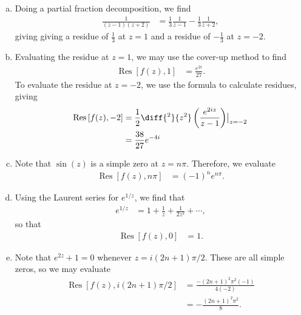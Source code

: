\documentclass[10pt]{mypackage}
\DeclareMathOperator{\res}{Res}
\begin{document}
\RaggedRight
\begin{solution}[21.1]\hfill
  \begin{enumerate}[(a)]
    \item Doing a partial fraction decomposition, we find
      \begin{align*}
        \frac{1}{\left( z-1 \right)\left( z+2 \right)} &= \frac{1}{3}\frac{1}{z-1} - \frac{1}{3}\frac{1}{z+2},
      \end{align*}
      giving giving a residue of $\frac{1}{3}$ at $z = 1$ and a residue of $-\frac{1}{3}$ at $z = -2$.
    \item Evaluating the residue at $z = 1$, we may use the cover-up method to find
      \begin{align*}
        \res\left[ f(z),1 \right] &= \frac{e^{2i}}{27}.
      \end{align*}
      To evaluate the residue at $z = -2$, we use the formula to calculate residues, giving
      \begin{align*}
        \res\left[ f(z),-2 \right] &= \frac{1}{2}\diff{^2}{z^2}\left( \frac{e^{2iz}}{z-1} \right)\bigr\vert_{z = -2}\\
                                   &= \frac{38}{27}e^{-4i}
      \end{align*}
    \item Note that $\sin(z)$ is a simple zero at $z = n\pi$. Therefore, we evaluate
      \begin{align*}
        \res\left[ f(z),n\pi \right] &= \left( -1 \right)^n e^{n\pi}.
      \end{align*}
    \item Using the Laurent series for $e^{1/z}$, we find that
      \begin{align*}
        e^{1/z} &= 1 + \frac{1}{z} + \frac{1}{2z^2} + \cdots,
      \end{align*}
      so that
      \begin{align*}
        \res\left[ f(z),0 \right] &= 1.
      \end{align*}
    \item Note that $e^{2z} + 1 = 0$ whenever $z = i(2n + 1)\pi/2$. These are all simple zeros, so we may evaluate
      \begin{align*}
        \res\left[ f(z),i\left( 2n + 1 \right)\pi/2 \right] &= \frac{-\left( 2n + 1 \right)^2\pi^2\left( -1 \right)}{4\left( -2 \right)}\\
                                                            &= -\frac{\left( 2n+1 \right)^2\pi^2}{8}.
      \end{align*}
  \end{enumerate}
\end{solution}
\end{document}
